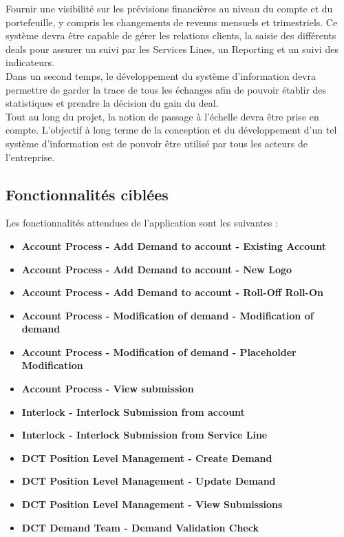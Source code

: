 Fournir une visibilité sur les prévisions financières au niveau du compte et du portefeuille, y compris les changements de revenus mensuels et trimestriels. Ce système devra être capable de gérer les relations clients, la saisie des différents deals pour assurer un suivi par les Services Lines, un Reporting et un suivi des indicateurs.
\\

Dans un second temps, le développement du système d’information devra permettre de garder la trace de tous les échanges afin de pouvoir établir des statistiques et prendre la décision du gain du deal.
\\

Tout au long du projet, la notion de passage à l’échelle devra être prise en compte. L’objectif à long terme de la conception et du développement d’un tel système d’information est de pouvoir être utilisé par tous les acteurs de l’entreprise.

\subsection{Fonctionnalités ciblées}

Les fonctionnalités attendues de l'application sont les suivantes :
\\

\begin{itemize}
    \item \textbf{Account Process - Add Demand to account - Existing Account}
    \item \textbf{Account Process - Add Demand to account - New Logo}
    \item \textbf{Account Process - Add Demand to account - Roll-Off Roll-On}
    \item \textbf{Account Process - Modification of demand - Modification of demand}
    \item \textbf{Account Process - Modification of demand - Placeholder Modification}
    \item \textbf{Account Process - View submission}
    \item \textbf{Interlock - Interlock Submission from account}
    \item \textbf{Interlock - Interlock Submission from Service Line}
    \item \textbf{DCT Position Level Management - Create Demand}
    \item \textbf{DCT Position Level Management - Update Demand}
    \item \textbf{DCT Position Level Management - View Submissions}
    \item \textbf{DCT Demand Team - Demand Validation Check}
\end{itemize}

